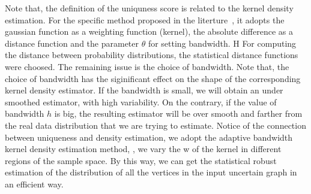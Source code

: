 Note that, the definition of the uniquness score is related to the kernel density estimation. For the specific method proposed in the literture~\cite{Boldi_Injecting_2012}, it adopts the gaussian function as a weighting function (kernel), the absolute difference as a distance function and the parameter $\theta$ for setting bandwidth. H
For computing the distance between probability distributions, the statistical distance functions were choosed. The remaining issue is the choice of bandwidth. Note that, the choice of bandwidth has the siginificant effect on the shape of the corresponding kernel density estimator. If the bandwidth is small, we will obtain an under smoothed estimator, with high variability. On the contrary, if the value of bandwidth $h$ is big, the resulting estimator will be over smooth and farther from the real data distribution that we are trying to estimate. Notice of the connection between uniqueness and density estimation, we adopt the adaptive bandwidth kernel density estimation method, {\ie}, we vary the w of the kernel in different regions of the sample space. By this way, we can get the statistical robust estimation of the distribution of all the vertices in the input uncertain graph in an efficient way. 
